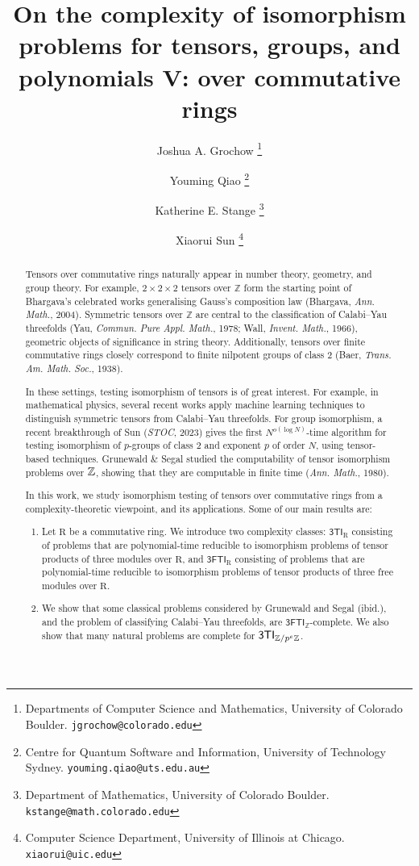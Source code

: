 \documentclass[11pt]{article}
\date{}
\title{
On the complexity of isomorphism problems for tensors, groups, and polynomials V: over commutative rings}
\author{
	Joshua A. Grochow
	\footnote{Departments of Computer Science and Mathematics, University of Colorado 
		Boulder. \tt{jgrochow@colorado.edu}}
	\and
	Youming Qiao
	\footnote{Centre for Quantum Software and Information, University of 
		Technology Sydney. \tt{youming.qiao@uts.edu.au}}
	\and
	Katherine E. Stange
	\footnote{Department of Mathematics, University of Colorado Boulder. \tt{kstange@math.colorado.edu}}
	\and
	Xiaorui Sun
	\footnote{Computer Science Department, University of Illinois at Chicago. {\tt xiaorui@uic.edu}}
}
\begin{document}
	
\maketitle

\begin{abstract}
Tensors over commutative rings naturally appear in number theory, geometry, and group theory. For example, $2\times 2\times 2$ tensors over $\mathbb{Z}$ form the starting point of Bhargava's celebrated works generalising Gauss's composition law (Bhargava, \emph{Ann. Math.}, 2004). Symmetric tensors over $\mathbb{Z}$ are central to the classification of Calabi--Yau threefolds (Yau, \emph{Commun. Pure Appl. Math.}, 1978; Wall, \emph{Invent. Math.}, 1966), geometric objects of significance in string theory. Additionally, tensors over finite commutative rings closely correspond to finite nilpotent groups of class 2 (Baer, \emph{Trans. Am. Math. Soc.}, 1938).
		
In these settings, testing isomorphism of tensors is of great interest. For example, in mathematical physics, several recent works apply machine learning techniques to distinguish symmetric tensors from Calabi--Yau threefolds. For group isomorphism, a recent breakthrough of Sun (\emph{STOC}, 2023) gives the first $N^{o(\log N)}$-time algorithm for testing isomorphism of $p$-groups of class $2$ and exponent $p$ of order $N$, using tensor-based techniques. Grunewald \& Segal studied the computability of tensor isomorphism problems over $\mathbb{Z}$, showing that they are computable in finite time (\emph{Ann. Math.}, 1980).
	
	
In this work, we study isomorphism testing of tensors over commutative rings from a complexity-theoretic viewpoint, and its applications. Some of our main results are:
\begin{enumerate}
\item Let $\mathrm{R}$ be a commutative ring. We introduce two complexity classes: $\mathsf{3TI}_\mathrm{R}$ consisting of problems that are polynomial-time reducible to isomorphism problems of tensor products of three modules over $\mathrm{R}$, and $\mathsf{3FTI}_\mathrm{R}$ consisting of problems that are polynomial-time reducible to isomorphism problems of tensor products of three free modules over $\mathrm{R}$.
		
\item We show that some classical problems considered by Grunewald and Segal (ibid.), and the problem of classifying Calabi--Yau threefolds, are $\mathsf{3FTI}_\mathbb{Z}$-complete. We also show that many natural problems are complete for $\mathsf{3TI}_{\mathbb{Z}/p^e\mathbb{Z}}$.


\end{enumerate}
\end{abstract}
\end{document}
